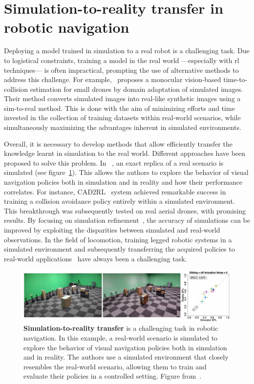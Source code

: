 \section{Simulation-to-reality transfer in robotic navigation}\label{sec:simulation-to-reality-transfer-in-robotic-navigation}
Deploying a model trained in simulation to a real robot is a challenging task.
Due to logistical constraints, training a model in the real world —especially with \acrshort{rl} techniques— is often impractical, prompting the use of alternative methods to address this challenge.
For example,~\cite{kim2022} proposes a monocular vision-based time-to-collision estimation for small drones by domain adaptation of simulated images.
Their method converts simulated images into real-like synthetic images using a sim-to-real method.
This is done with the aim of minimizing efforts and time invested in the collection of training datasets within real-world scenarios, while simultaneously maximizing the advantages inherent in simulated environments.

Overall, it is necessary to develop methods that allow efficiently transfer the knowledge learnt in simulation to the real world.
Different approaches have been proposed to solve this problem.
In ~\cite{kadian2020}, an exact replica of a real scenario is simulated (see figure~\ref{fig:sim2real}).
This allows the authors to explore the behavior of visual navigation policies both in simulation and in reality and how their performance correlates.
For instance, CAD2RL~\cite{sadeghiCAD2RLRealSingleImage2017} system achieved remarkable success in training a collision avoidance policy entirely within a simulated environment.
This breakthrough was subsequently tested on real aerial drones, with promising results.
By focusing on simulation refinement~\cite{Son2020}, the accuracy of simulations can be improved by exploiting the disparities between simulated and real-world observations.
In the field of locomotion, training legged robotic systems in a simulated environment and subsequently transferring the acquired policies to real-world applications~\cite{Hwangbo_2019, agarwal2022} have always been a challenging task.

\begin{figure}
    \includegraphics[width=\textwidth]{figures/related_work/sim2real}
    \caption[Simulation-to-reality transfer]{\textbf{Simulation-to-reality transfer} is a challenging task in robotic navigation.
    In this example, a real-world scenario is simulated to explore the behavior of visual navigation policies both in simulation and in reality.
    The authors use a simulated environment that closely resembles the real-world scenario, allowing them to train and evaluate their policies in a controlled setting.
    Figure from~\cite{kadian2020}.}
    \label{fig:sim2real}
\end{figure}

